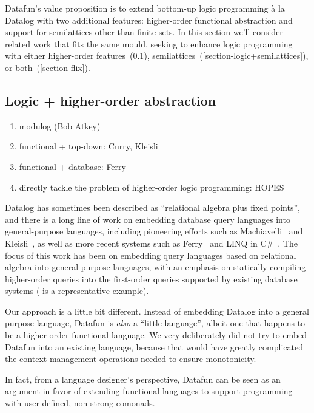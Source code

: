 Datafun's value proposition is to extend bottom-up logic programming \`a la
Datalog with two additional features: higher-order functional abstraction and
support for semilattices other than finite sets. In this section we'll consider
related work that fits the same mould, seeking to enhance logic programming with
either higher-order features~(\cref{section-logic+abstraction}),
semilattices~(\cref{section-logic+semilattices}), or both~(\cref{section-flix}).

\subsection{Logic + higher-order abstraction}
\label{section-logic+abstraction}

\begin{enumerate}[nosep]
\item modulog (Bob Atkey)
\item functional + top-down: Curry, Kleisli
\item functional + database: Ferry
\item directly tackle the problem of higher-order logic programming: HOPES
\end{enumerate}

\vspace{10pt}
\noindent
{}
Datalog has sometimes been described
as ``relational algebra plus fixed points'', and there is a long line
of work on embedding database query languages into general-purpose
languages, including pioneering efforts such as
Machiavelli~\citep{machiavelli} and Kleisli~\citep{kleisli}, as well as
more recent systems such as Ferry~\citep{ferry} and LINQ in C\#~\citep{linq-wadler}.
%
The focus of this work has been on embedding query languages based
on relational algebra into general purpose languages, with an emphasis
on statically compiling higher-order queries into the first-order
queries supported by existing database systems (\citet{query-shredding} is a
representative example).

Our approach is a little bit different. Instead of embedding Datalog
into a general purpose language, Datafun is \emph{also} a ``little
language'', albeit one that happens to be a higher-order
functional language. We very deliberately did not try to embed Datafun
into an existing language, because that would have greatly complicated
the context-management operations needed to ensure monotonicity.

In fact, from a language designer's perspective, Datafun can be seen
as an argument in favor of extending functional languages to support
programming with user-defined, non-strong comonads.

